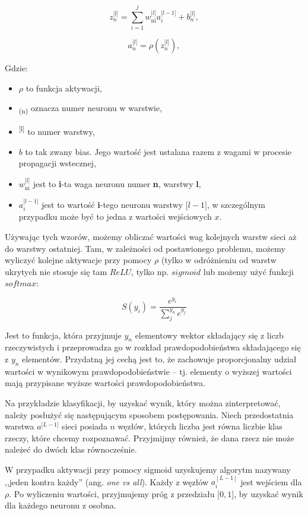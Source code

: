 \[z_{n}^{\lbrack l\rbrack}=\sum_{i=1}^{j}{w_{\text{ni}}^{\lbrack l\rbrack}a_{i}^{\lbrack l - 1\rbrack} + b_{n}^{\lbrack l\rbrack}},\]

\[a_{n}^{\lbrack l\rbrack}=\rho(z_{n}^{\lbrack l\rbrack}),\]

Gdzie:
\begin{itemize}
\item \(\rho\) to funkcja aktywacji,
\item \textsubscript{(n)} oznacza numer neuronu w warstwie,
\item \textsuperscript{{[}l{]}} to numer warstwy,
\item \(b\) to tak zwany bias. Jego wartość jest ustalana razem z wagami w procesie propagacji wstecznej,
\item \(w_{\text{ni}}^{\lbrack l\rbrack}\) jest to \textbf{i}-ta waga neuronu numer \textbf{n}, warstwy \textbf{l},
\item \(a_{i}^{\lbrack l - 1\rbrack}\) jest to wartość \textbf{i}-tego neuronu warstwy \({[}l-1{]}\), w szczególnym przypadku może być to jedna z wartości wejściowych \(x\).
\end{itemize}

Używając tych wzorów, możemy obliczać wartości wag kolejnych warstw sieci aż do warstwy ostatniej.
Tam, w zależności od postawionego problemu, możemy wyliczyć kolejne aktywacje przy pomocy \(\rho\) (tylko w odróżnieniu od warstw ukrytych nie stosuje się tam \(ReLU\), tylko np. \(sigmoid\) lub możemy użyć funkcji \(softmax\):

\[S(y_{i}) = \frac{e^{y_{\text{i\ }}}}{\sum_{j}^{y_{n}}e^{y_{j}}}\]

Jest to funkcja, która przyjmuje \(y_{n}\) elementowy wektor składający się z liczb rzeczywistych i przeprowadza go w rozkład prawdopodobieństwa składającego się z \(y_{n}\) elementów. Przydatną jej cechą jest to, że zachowuje proporcjonalny udział wartości w wynikowym prawdopodobieństwie -- tj. elementy o wyższej wartości mają przypisane wyższe wartości prawdopodobieństwa.

Na przykładzie klasyfikacji, by uzyskać wynik, który można zinterpretować, należy posłużyć się następującym sposobem postępowania. Niech przedostatnia warstwa \(a^{\lbrack L - 1\rbrack}\) sieci posiada \(n\) węzłów, których liczba jest równa liczbie klas rzeczy, które chcemy rozpoznawać. Przyjmijmy również, że dana rzecz nie może należeć do dwóch klas równocześnie.

W przypadku aktywacji przy pomocy sigmoid uzyskujemy algorytm nazywany ,,jeden kontra każdy'' (ang. \textit{one vs all}). Każdy z węzłów \(a_{i}^{\left\lbrack L - 1 \right\rbrack}\) jest wejściem dla \(\rho\). Po wyliczeniu wartości, przyjmujemy próg z przedziału \({[}0, 1{]}\), by uzyskać wynik dla każdego neuronu z osobna.

